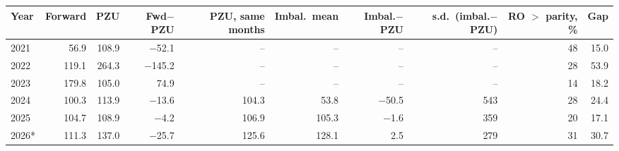 \begin{tabular}{lrrrrrrrrr}
\toprule
Year & Forward & PZU & Fwd$-$PZU & PZU, same months & Imbal.\ mean & Imbal.$-$PZU & s.d.\ (imbal.$-$PZU) & RO $>$ parity, \% & Gap \\
\midrule
2021 & 56.9 & 108.9 & $-$52.1 & -- & -- & -- & -- & 48 & 15.0 \\
2022 & 119.1 & 264.3 & $-$145.2 & -- & -- & -- & -- & 28 & 53.9 \\
2023 & 179.8 & 105.0 & 74.9 & -- & -- & -- & -- & 14 & 18.2 \\
2024 & 100.3 & 113.9 & $-$13.6 & 104.3 & 53.8 & $-$50.5 & 543 & 28 & 24.4 \\
2025 & 104.7 & 108.9 & $-$4.2 & 106.9 & 105.3 & $-$1.6 & 359 & 20 & 17.1 \\
2026* & 111.3 & 137.0 & $-$25.7 & 125.6 & 128.1 & 2.5 & 279 & 31 & 30.7 \\
\bottomrule
\end{tabular}
